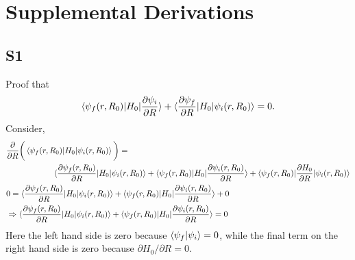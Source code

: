 \section{Supplemental Derivations}

\subsection{S1}
Proof that
\begin{align}
    \braket{\psi_f(r,R_0)|H_0|\frac{\partial \psi_i}{\partial R}}
    + \braket{\frac{\partial \psi_f}{\partial R}|H_0 |\psi_i(r,R_0)}  =  0 .
\end{align}
Consider,
\begin{align}
    & \frac{\partial}{\partial R}\bigg(\braket{\psi_f(r,R_0)|H_0 |\psi_i(r,R_0)}\bigg) = \\
    & \hspace{2cm} \braket{\frac{\partial \psi_f(r,R_0)}{\partial R}|H_0 |\psi_i(r,R_0)}
    + \braket{\psi_f(r,R_0)|H_0 |\frac{\partial \psi_i(r,R_0)}{\partial R}}
    + \braket{\psi_f(r,R_0)|\frac{\partial H_0}{\partial R} |\psi_i(r,R_0)} \nonumber \\
    & 0 = \braket{\frac{\partial \psi_f(r,R_0)}{\partial R}|H_0 |\psi_i(r,R_0)}
    + \braket{\psi_f(r,R_0)|H_0 |\frac{\partial \psi_i(r,R_0)}{\partial R}}
    + 0 \nonumber \\
    & \Rightarrow \braket{\frac{\partial \psi_f(r,R_0)}{\partial R}|H_0 |\psi_i(r,R_0)}
    + \braket{\psi_f(r,R_0)|H_0 |\frac{\partial \psi_i(r,R_0)}{\partial R}} = 0
\end{align}
Here the left hand side is zero because $\braket{\psi_{f}|\psi_{i}}=0$, while the final term on the right hand side is zero because $\partial H_0/\partial R = 0$.

